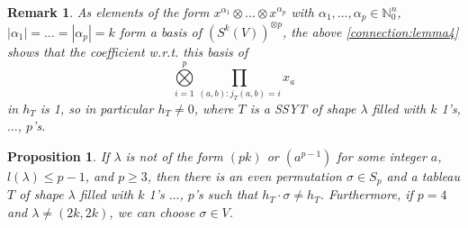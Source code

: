 \documentclass[a4paper]{amsart}
\newtheorem{proposition}{Proposition}
\newtheorem{remark}{Remark}
\def\N{{\mathbb{N}}}
\newcommand{\abs}[1]{\left| #1\right|}
\begin{document}
\begin{remark}
	As elements of the form $x^{\alpha_1}\otimes\ldots\otimes x^{\alpha_p}$ with $\alpha_1,\ldots,\alpha_p\in\N_0^n$, $\abs{\alpha_1}=\ldots=\abs{\alpha_p}=k$ form a basis of $(S^k(V))^{\otimes p}$,
	the above
	 \cref{connection:lemma4} shows that the coefficient w.r.t. this basis of 
	\begin{displaymath}
	\bigotimes\limits_{i=1}^p\prod\limits_{(a,b):j_T(a,b)=i}x_{a}
	\end{displaymath}
	in $h_T$ is 1, so in particular $h_T\neq 0$,
	where $T$ is a SSYT of shape $\lambda$ filled with $k$ 1's, $\ldots$, $p$'s.
\end{remark}
\begin{proposition}\label{connection:prop3}
	If $\lambda$ is not of the form $(pk)$ or $(a^{p-1})$ for some integer $a$,
	$l(\lambda)\leq p-1$, and $p\geq 3$, then there is an even permutation $\sigma\in S_p$ and a tableau $T$ of shape $\lambda$ filled with $k$ 1's $\ldots$, $p$'s such that $h_T\cdot\sigma\neq h_T$.
	Furthermore, if $p=4$ and $\lambda\neq (2k,2k)$, we can choose $\sigma\in V$.
\end{proposition}
\end{document}
